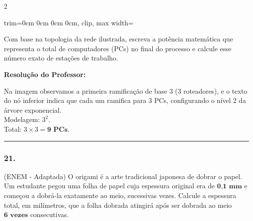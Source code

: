 \begin{multicols*}{2}
\begin{center}
\begin{adjustbox}{trim=0cm 0cm 0cm 0cm, clip, max width=\larguraTikz}
\end{adjustbox}
\end{center}
Com base na topologia da rede ilustrada, escreva a potência matemática que representa o total de computadores (PCs) no final do processo e calcule esse número exato de estações de trabalho.

\ifgabarito
    \begin{tcolorbox}[colback=CorTitUm!5, colframe=CorTitUm, boxrule=1pt, arc=4pt, left=6pt, right=6pt, top=6pt, bottom=6pt]
    \small\textbf{\textcolor{CorTitUm}{Resolução do Professor:}}\par\vspace{0.1cm}
    \color{CinzaEscuro}
    Na imagem observamos a primeira ramificação de base 3 (3 roteadores), e o texto do nó inferior indica que cada um ramifica para 3 PCs, configurando o nível 2 da árvore exponencial.\\
    Modelagem: $ 3^{2} $.\\
    Total: $ 3 \times 3 = \textbf{9 PCs} $.
    \end{tcolorbox}
\fi

\par\vspace{\espacoQuestao}

\noindent\textcolor{CorLinha}{\rule{\linewidth}{0.5pt}} 
\par\vspace{\espacoPreQuestao}
\subsubsection*{21.} (ENEM - Adaptada) O origami é a arte tradicional japonesa de dobrar o papel. Um estudante pegou uma folha de papel cuja espessura original era de $ \textbf{0,1 mm} $ e começou a dobrá-la exatamente ao meio, sucessivas vezes. Calcule a espessura total, em milímetros, que a folha dobrada atingirá após ser dobrada ao meio $ \textbf{6 vezes} $ consecutivas.


\end{multicols*}

